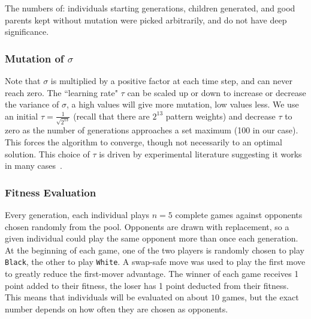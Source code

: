 \documentclass{acm_proc_article-sp}
\newcommand{\hblack}{\texttt{Black}}
\newcommand{\hwhite}{\texttt{White}}
\begin{document}
The numbers of:  individuals starting generations, children generated, and good parents kept without mutation
were picked arbitrarily, and do not have deep significance.

\subsubsection*{Mutation of $\sigma$}
Note that $\sigma$ is multiplied by a positive factor at each time step, and can never reach zero. 
The ``learning rate" $\tau$  can be scaled up or down to increase or decrease the variance of $\sigma$, a high values will give more mutation, low values less. 
We use an initial $\tau = \frac{1}{\sqrt{2^{13}}}$ (recall that there are $2^{13}$  pattern weights) and decrease $\tau$ to zero 
as the number of generations approaches a set maximum (100 in our case). 
This forces the algorithm to converge, though not necessarily to an optimal solution. 
This choice of $\tau$ is driven by experimental literature suggesting it works in many cases~\cite{Beyer:2007}.

%

\subsubsection*{Fitness Evaluation}

Every generation, each individual plays $n=5$ complete games against opponents chosen  randomly from the pool.
Opponents are drawn with replacement, so a given individual could play the same opponent more than once each generation. 
At the beginning of each game, one of the two players is randomly chosen to play \hblack, the other to play \hwhite. 
A swap-safe move was used to play the first move to greatly reduce the first-mover advantage. 
The winner of each game receives 1 point added to their fitness, the loser has 1 point deducted from their fitness.
This means that individuals will be evaluated on about $10$ games, but the exact number depends on how often they are
chosen as opponents.
\end{document}
